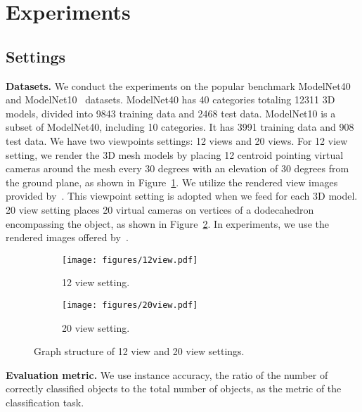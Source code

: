 \documentclass[11pt]{article}
\begin{document}
\section{Experiments}

\subsection{Settings}
\noindent\textbf{Datasets.}
We conduct the experiments on the popular benchmark ModelNet40~\citep{chang2015shapenet} and ModelNet10~\citep{chang2015shapenet} datasets. ModelNet40 has 40 categories totaling 12311 3D models, divided into 9843 training data and 2468 test data. ModelNet10 is a subset of ModelNet40, including 10 categories. It has 3991 training data and 908 test data. We have two viewpoints settings: 12 views and 20 views. For 12 view setting, we render the 3D mesh models by placing 12 centroid pointing virtual cameras around the mesh every 30 degrees with an elevation of 30 degrees from the ground plane, as shown in Figure~\ref{fig:12-view}. We utilize the rendered view images provided by~\citet{wang2017dominant}. This viewpoint setting is adopted when we feed  for each 3D model. 20 view setting places 20 virtual cameras on vertices of a dodecahedron encompassing the object, as shown in Figure~\ref{fig:20-view}. In experiments, we use the rendered images offered by~\citet{kanezaki2018rotationnet}.


\begin{figure}[htb!]
\vspace{0.2in}

    \centering
    \begin{subfigure}[b]{0.45\textwidth}
        \centering
        \texttt{[image: figures/12view.pdf]}
        \caption{12 view setting.}
        \label{fig:12-view}
    \end{subfigure}
    \hfill
    \begin{subfigure}[b]{0.45\textwidth}
        \centering
        \texttt{[image: figures/20view.pdf]}
        \caption{20 view setting.}
        \label{fig:20-view}
    \end{subfigure}
\caption{Graph structure of 12 view and 20 view settings.
}
\label{fig:graph}
\end{figure}

\vspace{0.2in}\noindent\textbf{Evaluation metric.} We use instance accuracy, the ratio of the number of correctly classified objects to the total number of objects, as the metric of the classification task.
\end{document}

